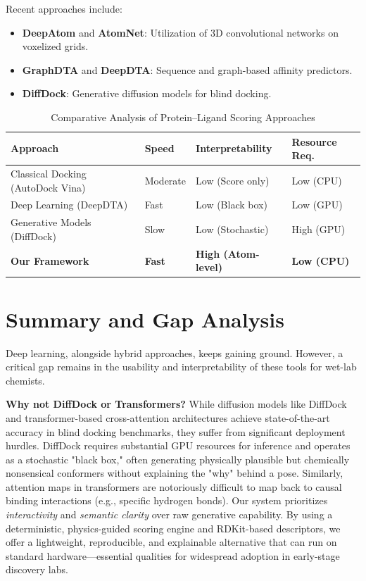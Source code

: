 \documentclass[conference]{IEEEtran}
\begin{document}
Recent approaches include:
\begin{itemize}
    \item \textbf{DeepAtom} and \textbf{AtomNet}: Utilization of 3D convolutional networks on voxelized grids.
    \item \textbf{GraphDTA} and \textbf{DeepDTA}: Sequence and graph-based affinity predictors.
    \item \textbf{DiffDock}: Generative diffusion models for blind docking.
\end{itemize}

\begin{table}[h]
\centering
\caption{Comparative Analysis of Protein--Ligand Scoring Approaches}
\label{tab:comparison}
\begin{tabular}{|p{2cm}|p{1.5cm}|p{2cm}|p{1.5cm}|}
\hline
\textbf{Approach} & \textbf{Speed} & \textbf{Interpretability} & \textbf{Resource Req.} \\ \hline
Classical Docking (AutoDock Vina) & Moderate & Low (Score only) & Low (CPU) \\ \hline
Deep Learning (DeepDTA) & Fast & Low (Black box) & Low (GPU) \\ \hline
Generative Models (DiffDock) & Slow & Low (Stochastic) & High (GPU) \\ \hline
\textbf{Our Framework} & \textbf{Fast} & \textbf{High (Atom-level)} & \textbf{Low (CPU)} \\ \hline
\end{tabular}
\end{table}

\section{Summary and Gap Analysis}

Deep learning, alongside hybrid approaches, keeps gaining ground. However, a critical gap remains in the usability and interpretability of these tools for wet-lab chemists.

\noindent
\textbf{Why not DiffDock or Transformers?}
While diffusion models like DiffDock and transformer-based cross-attention architectures achieve state-of-the-art accuracy in blind docking benchmarks, they suffer from significant deployment hurdles. DiffDock requires substantial GPU resources for inference and operates as a stochastic "black box," often generating physically plausible but chemically nonsensical conformers without explaining the "why" behind a pose. Similarly, attention maps in transformers are notoriously difficult to map back to causal binding interactions (e.g., specific hydrogen bonds).
Our system prioritizes \textit{interactivity} and \textit{semantic clarity} over raw generative capability. By using a deterministic, physics-guided scoring engine and RDKit-based descriptors, we offer a lightweight, reproducible, and explainable alternative that can run on standard hardware---essential qualities for widespread adoption in early-stage discovery labs.
\end{document}
